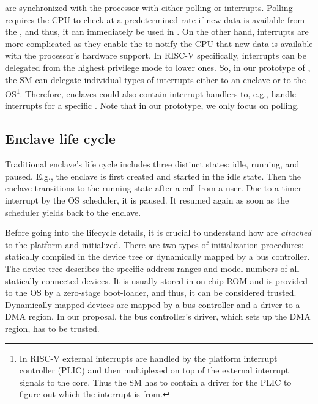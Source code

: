 
\sphw are synchronized with the processor with either polling or interrupts. Polling requires the CPU to check at a predetermined rate if new data is available from the \sphw, and thus, it can immediately be used in \name{}. On the other hand, interrupts are more complicated as they enable the \sphw to notify the CPU that new data is available with the processor's hardware support. In RISC-V specifically, interrupts can be delegated from the highest privilege mode to lower ones. So, in our prototype of \name{}, the SM can delegate individual types of interrupts either to an enclave or to the OS\footnote{In RISC-V external interrupts are handled by the platform interrupt controller (PLIC) and then multiplexed on top of the external interrupt signals to the core. Thus the SM has to contain a driver for the PLIC to figure out which \sphw the interrupt is from.}. Therefore, enclaves could also contain interrupt-handlers to, e.g., handle interrupts for a specific \sphw. Note that in our prototype, we only focus on polling. 

\subsection{Enclave life cycle}
\label{sec:lifeycle}

Traditional enclave's life cycle includes three distinct states: idle, running, and paused. E.g., the enclave is first created and started in the idle state. Then the enclave transitions to the running state after a call from a user. Due to a timer interrupt by the OS scheduler, it is paused. It resumed again as soon as the scheduler yields back to the enclave. 

Before going into the lifecycle details, it is crucial to understand how \sphw are \emph{attached} to the platform and initialized.
There are two types of initialization procedures: statically compiled in the device tree or dynamically mapped by a bus controller. 
The device tree describes the specific address ranges and model numbers of all statically connected \sphw devices. It is usually stored in on-chip ROM and is provided to the OS by a zero-stage boot-loader, and thus, it can be considered trusted.
Dynamically mapped devices are mapped by a bus controller and a driver to a DMA region. In our proposal, the bus controller's driver, which sets up the DMA region, has to be trusted.

